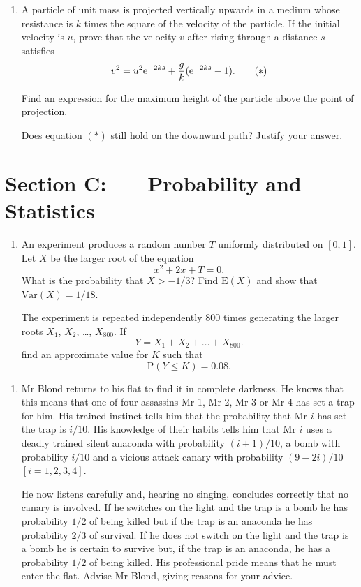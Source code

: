\documentclass[a4, 11pt]{report}
\newlength{\qspace}
\newcounter{qnumber}
\newenvironment{question}%
 {\vspace{\qspace}
  \begin{enumerate}[\bfseries 1\quad][10]%
    \setcounter{enumi}{\value{qnumber}}%
    \item%
 }
{
  \end{enumerate}
  \filbreak
  \stepcounter{qnumber}
 }
\def\e{{\rm e}}
\begin{document}
\begin{question}
A particle of unit mass is projected vertically upwards
in a medium whose resistance is $k$ times the square of the velocity of the
particle. If the initial velocity is $u$, prove that the velocity
$v$ after rising through a distance $s$ satisfies
\begin{equation*}
v^{2}=u^{2}\e^{-2ks}+\frac{g}{k}(\e^{-2ks}-1). \tag{\ensuremath{*}}
\end{equation*}

Find an expression for the maximum height of the particle above the
point of projection.

Does equation $(*)$ still hold on the downward path?
Justify your answer.
\end{question}
	

	
	\newpage
\section*{Section C: \ \ \ Probability and Statistics}


\begin{question}
An experiment produces a random number
$T$ uniformly distributed on $[0,1]$. 
Let $X$ be the larger root of the equation
\[x^{2}+2x+T=0.\]
What is the probability that $X>-1/3$? Find $\mathrm{E}(X)$
and show that $\mathrm{Var}(X)=1/18$.

The experiment is repeated independently 800 times generating
the larger roots $X_{1}$, $X_{2}$, \dots, $X_{800}$. If
\[Y=X_{1}+X_{2}+\dots+X_{800}.\]
find an approximate value for  $K$ such that
\[\mathrm{P}(Y\leqslant K)=0.08.\]
\end{question}

\begin{question}
Mr Blond returns to his flat to find
it in complete darkness. He knows that this
means that one of four assassins Mr 1, Mr 2,
Mr 3 or Mr 4 has set a trap for him.
His trained instinct tells him that the
probability that Mr $i$ has set the trap
is $i/10$. His knowledge of their habits
tells him that Mr $i$ uses 
a deadly trained silent anaconda
with probability
$(i+1)/10$,
a bomb with probability
$i/10$ and a vicious attack canary with probability
$(9-2i)/10$ $[i=1,2,3,4]$.
 
He now listens carefully and, hearing no singing,
concludes
correctly that no canary is involved. If he switches
on the light and the trap is a bomb he has probability
$1/2$  of being killed
but if the trap is an anaconda
he has probability $2/3$ of survival.
If he does not switch on the light
and the trap is a bomb he is certain to survive
but, if the trap is an anaconda, he has a probability $1/2$
of being killed.
His professional pride means that he must enter the flat.
Advise Mr Blond, giving reasons for your advice.
\end{question}
\end{document}
